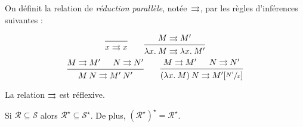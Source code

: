 \documentclass[./main]{subfiles}
\begin{document}
  \begin{defn}
    On définit la relation de \textit{réduction parallèle}, notée~$\rightrightarrows$, par les règles d'inférences suivantes :

    \begin{gather*}
      \begin{prooftree}
        \infer 0{x \rpar x}
      \end{prooftree}
      \quad\quad
      \begin{prooftree}
        \hypo{M \rpar M'}
        \infer 1{\lambda x.\: M \rpar \lambda x.\: M'}
      \end{prooftree}\\
      \begin{prooftree}
        \hypo{M \rpar M'}
        \hypo{N \rpar N'}
        \infer 2{M \: N \rpar M' \: N'}
      \end{prooftree}
      \quad\quad
      \begin{prooftree}
        \hypo{M \rpar M'}
        \hypo{N \rpar N'}
        \infer 2{(\lambda x.\: M) \: N \rpar M'[\sfrac{N'}{x}]}
      \end{prooftree}\\
    \end{gather*}
  \end{defn}

  \begin{lem}
    La relation $\rightrightarrows$ est réflexive.
  \end{lem}

  \begin{lem}
    Si $\mathcal{R} \subseteq \mathcal{S}$ alors $\mathcal{R}^\star \subseteq \mathcal{S}^\star$.
    De plus, $(\mathcal{R}^\star)^\star = \mathcal{R}^\star$.
  \end{lem}
\end{document}
